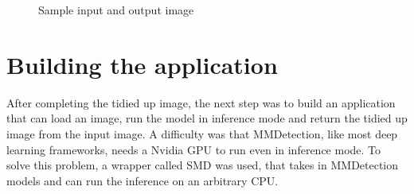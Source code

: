 \begin{figure}[H]
    \centering
    \qquad
    \caption{\label{fig:sample-input-output} Sample input and output image}
\end{figure}

\section{Building the application}

After completing the tidied up image, the next step was to build an application that can load an image, run the model in inference mode and return the tidied up image from the input image. A difficulty was that MMDetection, like most deep learning frameworks, needs a Nvidia GPU to run even in inference mode. To solve this problem, a wrapper called SMD was used, that takes in MMDetection models and can run the inference on an arbitrary CPU. \cite{SMD}

